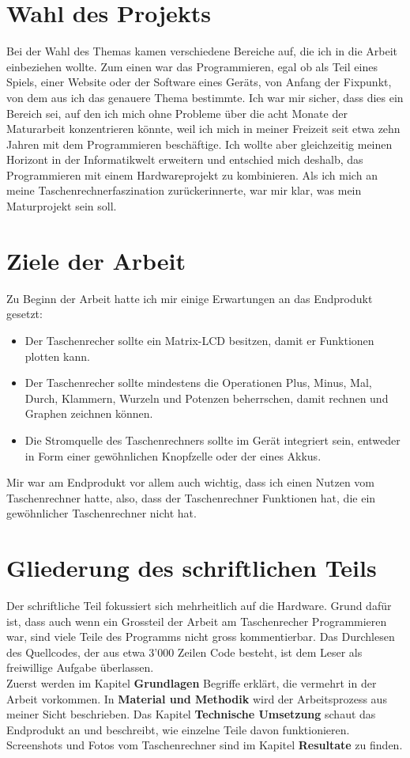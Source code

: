 \documentclass[12pt, a4paper]{report}
\begin{document}
\section{Wahl des Projekts}
Bei der Wahl des Themas kamen verschiedene Bereiche auf, die ich in die Arbeit einbeziehen wollte. Zum einen war das Programmieren, egal ob als Teil eines Spiels, einer Website oder der Software eines Geräts, von Anfang der Fixpunkt, von dem aus ich das genauere Thema bestimmte. Ich war mir sicher, dass dies ein Bereich sei, auf den ich mich ohne Probleme über die acht Monate der Maturarbeit konzentrieren könnte, weil ich mich in meiner Freizeit seit etwa zehn Jahren mit dem Programmieren beschäftige. Ich wollte aber gleichzeitig meinen Horizont in der Informatikwelt erweitern und entschied mich deshalb, das Programmieren mit einem Hardwareprojekt zu kombinieren. Als ich mich an meine Taschenrechnerfaszination zurückerinnerte, war mir klar, was mein Maturprojekt sein soll.
\section{Ziele der Arbeit}
Zu Beginn der Arbeit hatte ich mir einige Erwartungen an das Endprodukt gesetzt:
\begin{itemize}
\item Der Taschenrecher sollte ein Matrix-LCD besitzen, damit er Funktionen plotten kann.
\item Der Taschenrecher sollte mindestens die Operationen Plus, Minus, Mal, Durch, Klammern, Wurzeln und Potenzen beherrschen, damit rechnen und Graphen zeichnen können.
\item Die Stromquelle des Taschenrechners sollte im Gerät integriert sein, entweder in Form einer gewöhnlichen Knopfzelle oder der eines Akkus.
\end{itemize}
Mir war am Endprodukt vor allem auch wichtig, dass ich einen Nutzen vom Taschenrechner hatte, also, dass der Taschenrechner Funktionen hat, die ein gewöhnlicher Taschenrechner nicht hat.
\section{Gliederung des schriftlichen Teils}
Der schriftliche Teil fokussiert sich mehrheitlich auf die Hardware. Grund dafür ist, dass auch wenn ein Grossteil der Arbeit am Taschenrecher Programmieren war, sind viele Teile des Programms nicht gross kommentierbar. Das Durchlesen des Quellcodes, der aus etwa 3'000 Zeilen Code besteht, ist dem Leser als freiwillige Aufgabe überlassen.
\\[\medskipamount]
Zuerst werden im Kapitel \textbf{Grundlagen} Begriffe erklärt, die vermehrt in der Arbeit vorkommen. In \textbf{Material und Methodik} wird der Arbeitsprozess aus meiner Sicht beschrieben. Das Kapitel \textbf{Technische Umsetzung} schaut das Endprodukt an und beschreibt, wie einzelne Teile davon funktionieren. Screenshots und Fotos vom Taschenrechner sind im Kapitel \textbf{Resultate} zu finden.
\end{document}
